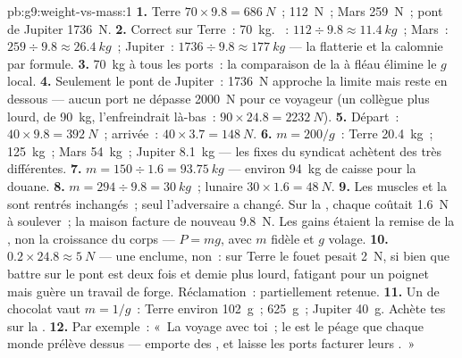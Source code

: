 \begin{solution}{pb:g9:weight-vs-mass:1}
\textbf{1.} Terre $70 \times 9.8 = \qty{686}{N}$~; 
\qty{112}{N}~; Mars \qty{259}{N}~; pont de Jupiter \qty{1736}{N}.
\textbf{2.} Correct sur Terre~: \qty{70}{kg}. ~:
$112 \div 9.8 \approx \qty{11.4}{kg}$~; Mars~:
$259 \div 9.8 \approx \qty{26.4}{kg}$~; Jupiter~:
$1736 \div 9.8 \approx \qty{177}{kg}$ --- la flatterie et la calomnie
par formule.
\textbf{3.} \qty{70}{kg} à tous les ports~: la comparaison de la
 à fléau élimine le $g$ local.
\textbf{4.} Seulement le pont de Jupiter~: \qty{1736}{N} approche la
limite mais reste en dessous --- aucun port ne dépasse \qty{2000}{N}
pour ce voyageur (un collègue plus lourd, de \qty{90}{kg},
l'enfreindrait là-bas~: $90 \times 24.8 = \qty{2232}{N}$).
\textbf{5.} Départ~: $40 \times 9.8 = \qty{392}{N}$~; arrivée~:
$40 \times 3.7 = \qty{148}{N}$.
\textbf{6.} $m = 200/g$~: Terre \qty{20.4}{kg}~;  \qty{125}{kg}~;
Mars \qty{54}{kg}~; Jupiter \qty{8.1}{kg} --- les  fixes du
syndicat achètent des  très différentes.
\textbf{7.} $m = 150 \div 1.6 = \qty{93.75}{kg}$ --- environ
\qty{94}{kg} de caisse pour la douane.
\textbf{8.} $m = 294 \div 9.8 = \qty{30}{kg}$~;  lunaire
$30 \times 1.6 = \qty{48}{N}$.
\textbf{9.} Les muscles et la  sont rentrés inchangés~; seul
l'adversaire a changé. Sur la , chaque  coûtait
\qty{1.6}{N} à soulever~; la maison facture de nouveau \qty{9.8}{N}.
Les gains étaient la remise de la , non la croissance du corps ---
$P = m g$, avec $m$ fidèle et $g$ volage.
\textbf{10.} $0.2 \times 24.8 \approx \qty{5}{N}$ --- une enclume,
non~: sur Terre le fouet pesait \qty{2}{N}, si bien que battre sur le
pont est deux fois et demie plus lourd, fatigant pour un poignet mais
guère un travail de forge. Réclamation~: partiellement retenue.
\textbf{11.} Un  de chocolat vaut $m = 1/g$~: Terre environ
\qty{102}{g}~;  \qty{625}{g}~; Jupiter \qty{40}{g}. Achète tes
 sur la .
\textbf{12.} Par exemple~: «~La  voyage avec toi~; le  est
le péage que chaque monde prélève dessus --- emporte des ,
et laisse les ports facturer leurs .~»
\end{solution}
